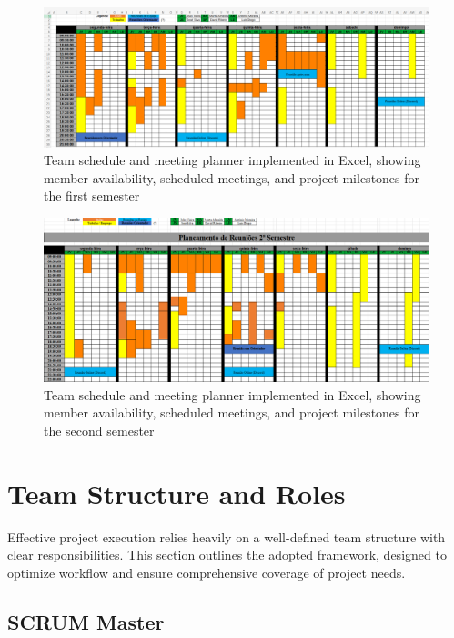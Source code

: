 \begin{figure}[H]
      \centering
      \includegraphics[width=16cm]{figs/team_schedule_1.png}
      \caption{Team schedule and meeting planner implemented in Excel, showing member availability, scheduled meetings, and project milestones for the first semester}
      \label{fig:schedule1}
\end{figure}

\begin{figure}[H]
      \centering
      \includegraphics[width=16cm]{figs/team_schedule_2.png}
      \caption{Team schedule and meeting planner implemented in Excel, showing member availability, scheduled meetings, and project milestones for the second semester}
      \label{fig:schedule2}
\end{figure}

\section{Team Structure and Roles}
\label{section:team_structure}

Effective project execution relies heavily on a well-defined team structure with clear responsibilities. This section outlines the adopted framework, designed to optimize workflow and ensure comprehensive coverage of project needs.

\newpage

\subsection{SCRUM Master}
\label{subsec:scrum_master}

